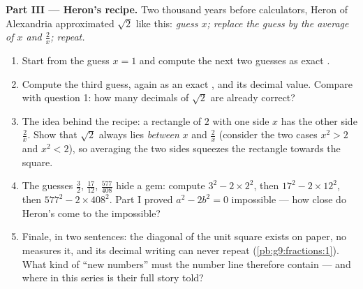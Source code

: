 \begin{problem}
\medskip
\noindent\textbf{Part III --- Heron's recipe.}
Two thousand years before calculators, Heron of Alexandria
approximated $\sqrt2$ like this: \emph{guess $x$; replace the
guess by the average of $x$ and $\frac2x$; repeat.}
\begin{enumerate}[resume]
  \item Start from the guess $x = 1$ and compute the next two
        guesses as exact .
  \item Compute the third guess, again as an exact , and
        its decimal value. Compare with question 1: how many
        decimals of $\sqrt2$ are already correct?
  \item The idea behind the recipe: a rectangle of  $2$ with
        one side $x$ has the other side $\frac2x$. Show that
        $\sqrt2$ always lies \emph{between} $x$ and $\frac2x$
        (consider the two cases $x^2 > 2$ and $x^2 < 2$), so
        averaging the two sides squeezes the rectangle towards
        the square.
  \item The guesses $\frac32$, $\frac{17}{12}$,
        $\frac{577}{408}$ hide a gem: compute $3^2 - 2 \times
        2^2$, then $17^2 - 2 \times 12^2$, then
        $577^2 - 2 \times 408^2$. Part I proved
        $a^2 - 2b^2 = 0$ impossible --- how close do Heron's
         come to the impossible?
  \item Finale, in two sentences: the diagonal of the unit
        square exists on paper, no  measures it, and its
        decimal writing can never repeat
        (\cref{pb:g9:fractions:1}). What kind of ``new numbers''
        must the number line therefore contain --- and where in
        this series is their full story told?
\end{enumerate}
\end{problem}
